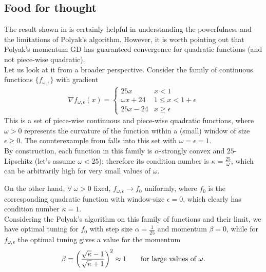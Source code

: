 \documentclass{article}
\begin{document}
\subsection{Food for thought}
The result shown in \cite{2014arXiv1408.3595L} is certainly helpful in understanding the powerfulness and the limitations of Polyak's algorithm. However, it is worth pointing out that Polyak's momentum GD has guaranteed convergence for quadratic functions (and not piece-wise quadratic). \\


Let us look at it from a broader perspective. Consider the family of continuous functions $\{f_{\omega,\epsilon}\}$ with gradient
\begin{gather}
	\nabla f_{\omega, \epsilon}(x) =  \begin{cases}
    25x &   x < 1 \\
    \omega x+24   &  1 \leq x < 1+\epsilon \\
    25x-24 & x \geq \epsilon
\end{cases}
\end{gather}
This is a set of piece-wise continuous and piece-wise quadratic functions, where $\omega >0$ represents the curvature of the function within a (small) window of size $\epsilon \geq0$. The counterexample from \cite{2014arXiv1408.3595L} falls into this set with $\omega =\epsilon = 1$.\\

By construction, each function in this family is $\alpha$-strongly convex and $25$-Lipschitz (let's assume $\omega <25$): therefore its condition number is $\kappa = \frac{25}{\omega}$, which can be arbitrarily high for very small values of $\omega$. 

On the other hand, $\forall \ \omega>0$ fixed, $f_{\omega, \epsilon} \to f_0$ uniformly, where $f_0$ is the corresponding quadratic function with window-size $\epsilon =0$, which clearly has condition number $\kappa = 1$.\\

Considering the Polyak's algorithm on this family of functions and their limit, we have optimal tuning for $f_0$ with step size $\alpha = \frac{1}{25}$ and momentum $\beta = 0$, while for $f_{\omega,\epsilon}$ the optimal tuning gives a value for the momentum 
$$\beta = \left(\dfrac{\sqrt{\kappa} -1}{\sqrt{\kappa}+1}\right)^2 \approx 1 \qquad \text{for large values of } \omega.$$
\end{document}
